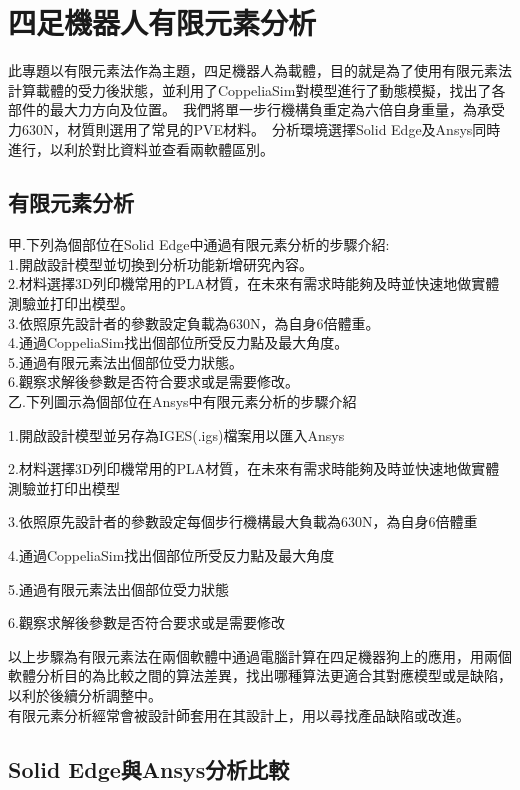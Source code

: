 \chapter{四足機器人有限元素分析}

此專題以有限元素法作為主題，四足機器人為載體，目的就是為了使用有限元素法計算載體的受力後狀態，並利用了CoppeliaSim對模型進行了動態模擬，找出了各部件的最大力方向及位置。\
我們將單一步行機構負重定為六倍自身重量，為承受力630N，材質則選用了常見的PVE材料。\
分析環境選擇Solid Edge及Ansys同時進行，以利於對比資料並查看兩軟體區別。\\

\section{有限元素分析}

甲.下列為個部位在Solid Edge中通過有限元素分析的步驟介紹:\\
 
1.開啟設計模型並切換到分析功能新增研究內容。\\

2.材料選擇3D列印機常用的PLA材質，在未來有需求時能夠及時並快速地做實體測驗並打印出模型。\\

3.依照原先設計者的參數設定負載為630N，為自身6倍體重。\\

4.通過CoppeliaSim找出個部位所受反力點及最大角度。\\

5.通過有限元素法出個部位受力狀態。\\

6.觀察求解後參數是否符合要求或是需要修改。\\

乙.下列圖示為個部位在Ansys中有限元素分析的步驟介紹
 
1.開啟設計模型並另存為IGES(.igs)檔案用以匯入Ansys

2.材料選擇3D列印機常用的PLA材質，在未來有需求時能夠及時並快速地做實體測驗並打印出模型

3.依照原先設計者的參數設定每個步行機構最大負載為630N，為自身6倍體重

4.通過CoppeliaSim找出個部位所受反力點及最大角度

5.通過有限元素法出個部位受力狀態

6.觀察求解後參數是否符合要求或是需要修改


以上步驟為有限元素法在兩個軟體中通過電腦計算在四足機器狗上的應用，用兩個軟體分析目的為比較之間的算法差異，找出哪種算法更適合其對應模型或是缺陷，以利於後續分析調整中。\\
有限元素分析經常會被設計師套用在其設計上，用以尋找產品缺陷或改進。\\

\newpage

\section{Solid Edge與Ansys分析比較}

\newpage

